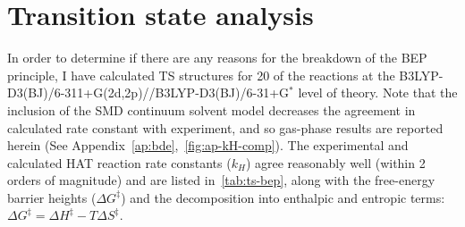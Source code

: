 \newpage
\section{Transition state analysis}

In order to determine if there are any reasons for the breakdown of the BEP
principle, I have calculated TS structures for 20 of the reactions at the
B3LYP-D3(BJ)/6-311+G(2d,2p)//B3LYP-D3(BJ)/6-31+G$^*$ level of theory. Note that
the inclusion of the SMD continuum solvent model decreases the agreement in
calculated rate constant with experiment, and so gas-phase results are reported
herein (See Appendix~\ref{ap:bde},~\ref{fig:ap-kH-comp}). The experimental and
calculated HAT reaction rate constants ($k_H$) agree reasonably well (within 2
orders of magnitude) and are listed in~\ref{tab:ts-bep}, along with the
free-energy barrier heights ($\Delta G^\ddagger$) and the decomposition into
enthalpic and entropic terms: $\Delta G^\ddagger = \Delta H^\ddagger - T\Delta
S^\ddagger$.

